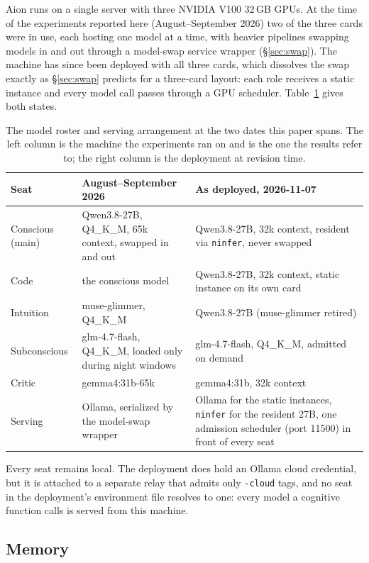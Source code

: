 \documentclass[11pt,a4paper]{article}
\begin{document}
Aion runs on a single server with three NVIDIA V100 32\,GB GPUs. At the time of the experiments reported here (August--September 2026) two of the three cards were in use, each hosting one model at a time, with heavier pipelines swapping models in and out through a model-swap service wrapper (\S\ref{sec:swap}). The machine has since been deployed with all three cards, which dissolves the swap exactly as \S\ref{sec:swap} predicts for a three-card layout: each role receives a static instance and every model call passes through a GPU scheduler. Table~\ref{tab:roster} gives both states.

\begin{table}[h]
\centering
\small
\begin{tabular}{@{}p{2.4cm}p{5.1cm}p{5.6cm}@{}}
\toprule
Seat & August--September 2026 & As deployed, 2026-11-07 \\
\midrule
Conscious (main) & Qwen3.8-27B, Q4\_K\_M, 65k context, swapped in and out & Qwen3.8-27B, 32k context, resident via \texttt{ninfer}, never swapped \\
Code & the conscious model & Qwen3.8-27B, 32k context, static instance on its own card \\
Intuition & muse-glimmer, Q4\_K\_M & Qwen3.8-27B (muse-glimmer retired) \\
Subconscious & glm-4.7-flash, Q4\_K\_M, loaded only during night windows & glm-4.7-flash, Q4\_K\_M, admitted on demand \\
Critic & gemma4:31b-65k & gemma4:31b, 32k context \\
Serving & Ollama, serialized by the model-swap wrapper & Ollama for the static instances, \texttt{ninfer} for the resident 27B, one admission scheduler (port 11500) in front of every seat \\
\bottomrule
\end{tabular}
\caption{The model roster and serving arrangement at the two dates this paper spans. The left column is the machine the experiments ran on and is the one the results refer to; the right column is the deployment at revision time.}
\label{tab:roster}
\end{table}

Every seat remains local. The deployment does hold an Ollama cloud credential, but it is attached to a separate relay that admits only \texttt{-cloud} tags, and no seat in the deployment's environment file resolves to one: every model a cognitive function calls is served from this machine.


\subsection{Memory}
\end{document}
